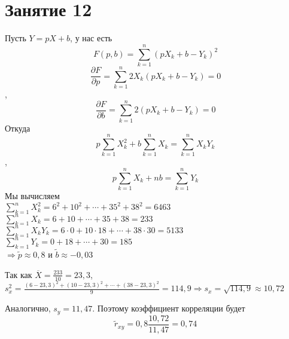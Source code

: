 \section*{Занятие 12}

\begin{exercise}[1]
	Пусть $Y = pX + b$, у нас есть $$F(p, b) = \sum_{k=1}^{n}(pX_k + b - Y_k)^2$$ $$\frac{\partial F}{\partial p} = \sum_{k=1}^{n}2X_k(pX_k + b - Y_k) = 0$$, $$\frac{\partial F}{\partial b} = \sum_{k=1}^{n} 2(pX_k + b - Y_k) = 0$$ Откуда $$p\sum_{k=1}^{n}X_k^2 + b\sum_{k=1}^{n}X_k = \sum_{k=1}^{n}X_k Y_k$$, $$p\sum_{k=1}^{n}X_k + nb = \sum_{k=1}^{n}Y_k$$ Мы вычисляем \\
	
	$\sum_{k=1}^{n}X_k^2 = 6^2 + 10^2 + \cdots + 35^2 + 38^2 = 6463$ \\ $\sum_{k=1}^{n}X_k = 6 + 10 + \cdots + 35 + 38 = 233$ \\ $\sum_{k=1}^{n}X_k Y_k = 6 \cdot 0 + 10 \cdot 18 + \cdots + 38 \cdot 30 = 5133$ \\ $\sum_{k=1}^{n}Y_k = 0 + 18 + \cdots + 30 = 185$ \\ $\Rightarrow \tilde{p} \approx 0,8$ и $\tilde{b} \approx -0,03$
	
	Так как $\overline{X} = \frac{233}{10} = 23,3$, \\ $s_x^2 = \frac{(6-23,3)^2 + (10 - 23,3)^2 + \cdots + (38 - 23,3)^2}{9} = 114,9 \Rightarrow s_x = \sqrt{114,9} \approx 10,72$
	
	Аналогично, $s_y = 11,47$. Поэтому коэффициент корреляции будет $$\tilde{r}_{xy} = 0,8 \frac{10,72}{11,47} = 0,74$$
\end{exercise}